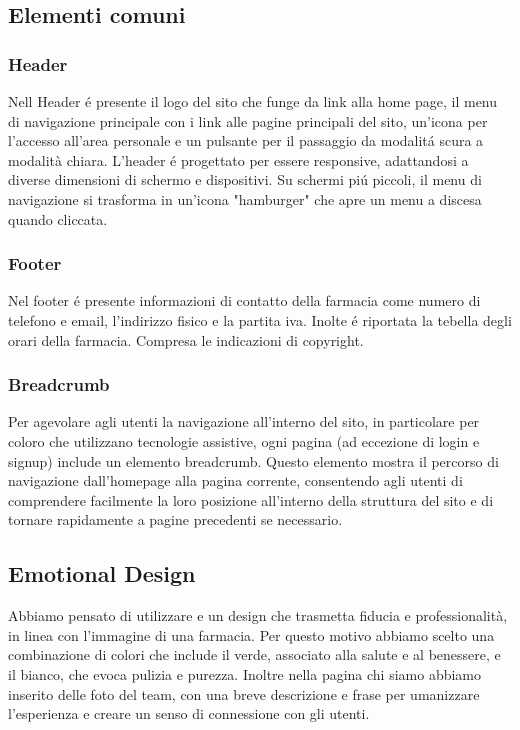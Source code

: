 \subsection{Elementi comuni}

\subsubsection{Header}

Nell Header é presente il logo del sito che funge da link alla home page, il menu di navigazione principale con i link alle pagine principali del sito, un'icona per l'accesso all'area personale e un pulsante per il passaggio da modalitá scura a modalità chiara. L'header é progettato per essere responsive, adattandosi a diverse dimensioni di schermo e dispositivi. Su schermi piú piccoli, il menu di navigazione si trasforma in un'icona "hamburger" che apre un menu a discesa quando cliccata.
\subsubsection{Footer}

Nel footer é presente informazioni di contatto della farmacia come numero di telefono e email, l'indirizzo fisico e la partita iva. Inolte é riportata la tebella degli orari della farmacia. Compresa le indicazioni di copyright.

\subsubsection{Breadcrumb}

Per agevolare agli utenti la navigazione all'interno del sito, in particolare per coloro che utilizzano tecnologie assistive, ogni pagina (ad eccezione di login e signup) include un elemento breadcrumb. Questo elemento mostra il percorso di navigazione dall'homepage alla pagina corrente, consentendo agli utenti di comprendere facilmente la loro posizione all'interno della struttura del sito e di tornare rapidamente a pagine precedenti se necessario.

\subsection{Emotional Design}

Abbiamo pensato di utilizzare e un design che trasmetta fiducia e professionalità, in linea con l'immagine di una farmacia. Per questo motivo abbiamo scelto una combinazione di colori che include il verde, associato alla salute e al benessere, e il bianco, che evoca pulizia e purezza. Inoltre nella pagina chi siamo abbiamo inserito delle foto del team, con una breve descrizione e frase per umanizzare l'esperienza e creare un senso di connessione con gli utenti.